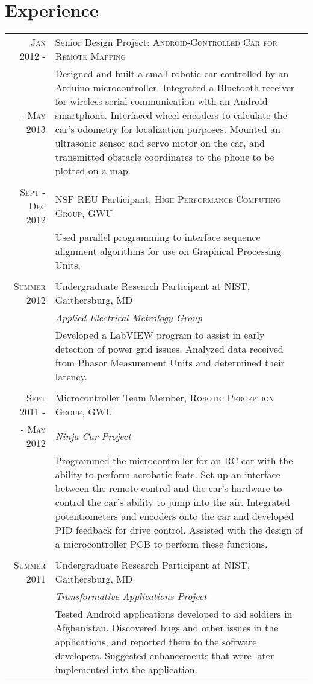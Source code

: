 \documentclass[a4paper,10pt]{article}
\begin{document}
\section{Experience}
\begin{tabular}{r p{11cm}}
 \textsc{Jan 2012 -} & Senior Design Project: \textsc{Android-Controlled Car for Remote Mapping} \\
 \textsc{- May 2013} &\footnotesize{Designed and built a small robotic car controlled by an Arduino microcontroller.  Integrated a Bluetooth receiver for wireless serial communication with an Android smartphone.  Interfaced wheel encoders to calculate the car's odometry for localization purposes.  Mounted an ultrasonic sensor and servo motor on the car, and transmitted obstacle coordinates to the phone to be plotted on a map.} \\
&\\
 \textsc{Sept - Dec 2012} & NSF REU Participant, \textsc{High Performance Computing Group}, \textsc{GWU} \\
 &\footnotesize{Used parallel programming to interface sequence alignment algorithms for use on Graphical Processing Units.} \\
&\\
 \textsc{Summer 2012} & Undergraduate Research Participant at \textsc{NIST}, Gaithersburg, MD \\
 &\emph{Applied Electrical Metrology Group}\\
 &\footnotesize{Developed a LabVIEW program to assist in early detection of power grid issues.  Analyzed data received from Phasor Measurement Units and determined their latency.} \\
&\\
 \textsc{Sept 2011 -} &  Microcontroller Team Member, \textsc{Robotic Perception Group}, \textsc{GWU} \\
\textsc{- May 2012} &\emph{Ninja Car Project}\\
 &\footnotesize{Programmed the microcontroller for an RC car with the ability to perform acrobatic feats.  Set up an interface between the remote control and the car's hardware to control the car's ability to jump into the air.  Integrated potentiometers and encoders onto the car and developed PID feedback for drive control.  Assisted with the design of a microcontroller PCB to perform these functions.} \\
&\\
 \textsc{Summer 2011} & Undergraduate Research Participant at \textsc{NIST}, Gaithersburg, MD \\
 &\emph{Transformative Applications Project}\\
 &\footnotesize{Tested Android applications developed to aid soldiers in Afghanistan.  Discovered bugs and other issues in the applications, and reported them to the software developers.  Suggested enhancements that were later implemented into the application.} \\
\end{tabular}
\end{document}
